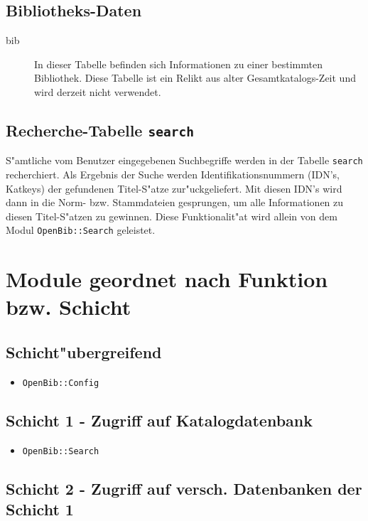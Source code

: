 \documentclass[11pt, twoside, a4paper, BCOR8mm, DIV12, bibtotoc,idxtotoc]{scrbook}
\begin{document}
\section{Bibliotheks-Daten}

\begin{description}
\item[bib] In dieser Tabelle befinden sich Informationen zu einer
  bestimmten Bibliothek. Diese Tabelle ist ein Relikt aus alter
  Gesamtkatalogs-Zeit und wird derzeit nicht verwendet.
\end{description}


\section{Recherche-Tabelle \texttt{search}}

S"amtliche vom Benutzer eingegebenen Suchbegriffe werden in der Tabelle
\texttt{search} recherchiert. Als Ergebnis der Suche werden
Identifikationsnummern (IDN's, Katkeys) der gefundenen Titel-S"atze
zur"uckgeliefert. Mit diesen IDN's wird dann in die Norm- bzw.
Stammdateien gesprungen, um alle Informationen zu diesen Titel-S"atzen
zu gewinnen. Diese Funktionalit"at wird allein von dem Modul
\texttt{OpenBib::Search} geleistet.

\chapter{Module geordnet nach Funktion bzw. Schicht}


\section{Schicht"ubergreifend}


\begin{itemize}
\item \texttt{OpenBib::Config}
\end{itemize}

\section{Schicht 1 - Zugriff auf Katalogdatenbank}

\begin{itemize}
\item \texttt{OpenBib::Search}
\end{itemize}

\section{Schicht 2 - Zugriff auf versch. Datenbanken der Schicht 1}
\end{document}
